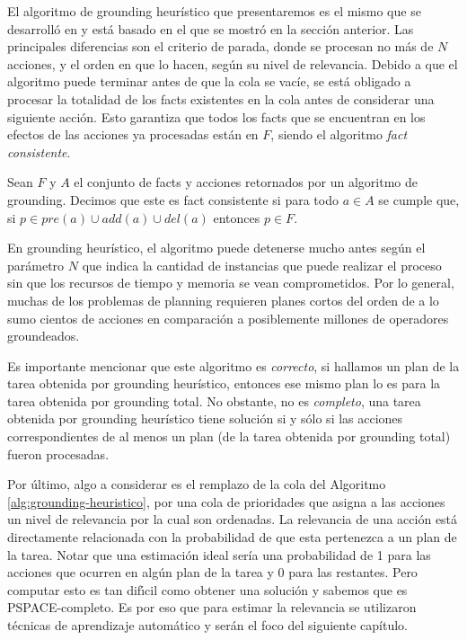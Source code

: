 El algoritmo de grounding heurístico que presentaremos es el mismo que se
desarrolló en \citep{Gnad_Torralba_Dominguez_Areces_Bustos_2019} y está basado
en el que se mostró en la sección anterior. Las principales diferencias son el
criterio de parada, donde se procesan no más de $N$ acciones, y el orden en que
lo hacen, según su nivel de relevancia. Debido a que el algoritmo puede
terminar antes de que la cola se vacíe, se está obligado a procesar la totalidad
de los facts existentes en la cola antes de considerar una siguiente acción. Esto garantiza
que todos los facts que se encuentran en los efectos de las acciones ya
procesadas están en $F$, siendo el algoritmo \emph{fact consistente}.

\begin{mydef}
    Sean $F$ y $A$ el conjunto de facts y acciones retornados por un algoritmo
    de grounding. Decimos que este es fact consistente si para todo $a \in A$ se
    cumple que, si $p \in pre(a) \cup add(a) \cup del(a)$ entonces $p \in F$.
\end{mydef}

En grounding heurístico, el algoritmo puede detenerse mucho antes según el
parámetro $N$ que indica la cantidad de instancias que puede realizar el proceso
sin que los recursos de tiempo y memoria se vean comprometidos. Por lo general,
muchas de los problemas de planning requieren planes cortos del orden de a lo
sumo cientos de acciones en comparación a posiblemente millones de operadores
groundeados.

Es importante mencionar que este algoritmo es \emph{correcto}, si hallamos un
plan de la tarea obtenida por grounding heurístico, entonces ese mismo plan lo
es para la tarea obtenida por grounding total. No obstante, no es
\emph{completo}, una tarea obtenida por grounding heurístico tiene solución si y
sólo si las acciones correspondientes de al menos un plan (de la tarea obtenida
por grounding total) fueron procesadas.

Por último, algo a considerar es el remplazo de la cola del Algoritmo
\ref{alg:grounding-heuristico}, por una cola de prioridades que asigna a las
acciones un nivel de relevancia por la cual son ordenadas. La relevancia de una
acción está directamente relacionada con la probabilidad de que esta pertenezca
a un plan de la tarea. Notar que una estimación ideal sería una probabilidad de
1 para las acciones que ocurren en algún plan de la tarea y 0 para las
restantes. Pero computar esto es tan difı́cil como obtener una solución
y sabemos que es PSPACE-completo. Es por eso que para estimar la relevancia se
utilizaron técnicas de aprendizaje automático y serán el foco del siguiente
capítulo.
